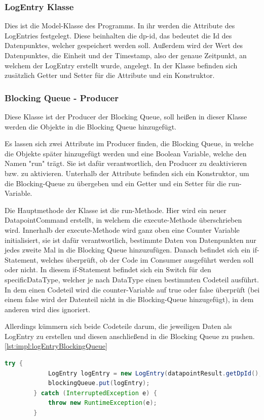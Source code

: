 \subsubsection{LogEntry Klasse}
Dies ist die Model-Klasse des Programms. In ihr werden die Attribute des LogEntries festgelegt. Diese beinhalten die dp-id, das bedeutet die Id des Datenpunktes, welcher gespeichert werden soll. Außerdem wird der Wert des Datenpunktes, die Einheit und der Timestamp, also der genaue Zeitpunkt, an welchem der LogEntry erstellt wurde, angelegt. In der Klasse befinden sich zusätzlich Getter und Setter für die Attribute und ein Konstruktor.
 
\subsubsection{Blocking Queue - Producer }
Diese Klasse ist der Producer der Blocking Queue, soll heißen in dieser Klasse werden die Objekte in die Blocking Queue hinzugefügt.
 
Es lassen sich zwei Attribute im Producer finden, die Blocking Queue, in welche die Objekte später hinzugefügt werden und eine Boolean Variable, welche den Namen "run" trägt. Sie ist dafür verantwortlich, den Producer zu deaktivieren bzw. zu aktivieren. Unterhalb der Attribute befinden sich ein Konstruktor, um die Blocking-Queue zu übergeben und ein Getter und ein Setter für die run-Variable.

Die Hauptmethode der Klasse ist die run-Methode. Hier wird ein neuer DatapointCommand erstellt, in welchem die execute-Methode überschrieben wird. Innerhalb der execute-Methode wird ganz oben eine Counter Variable initialisiert, sie ist dafür verantwortlich, bestimmte Daten von Datenpunkten nur jedes zweite Mal in die Blocking Queue hinzuzufügen. Danach befindet sich ein if-Statement, welches überprüft, ob der Code im Consumer ausgeführt werden soll oder nicht. In diesem if-Statement befindet sich ein Switch für den specificDataType, welcher je nach DataType einen bestimmten Codeteil ausführt. In dem einen Codeteil wird die counter-Variable auf true oder false überprüft (bei einem false wird der Datenteil nicht in die Blocking-Queue hinzugefügt), in dem anderen wird dies ignoriert.
 
Allerdings kümmern sich beide Codeteile darum, die jeweiligen Daten als LogEntry zu erstellen und diesen anschließend in die Blocking Queue zu pushen. \ref{lst:impl:logEntryBlockingQueue}

\begin{lstlisting}[language=java,caption=LogEntry in BlockingQueue hinzufügen,label=lst:impl:logEntryBlockingQueue]
    try {
            LogEntry logEntry = new LogEntry(datapointResult.getDpId(), datapointResult.getValue(), "A", datapointResult.getTimestamp());
            blockingQueue.put(logEntry);
        } catch (InterruptedException e) {
            throw new RuntimeException(e);
        }
\end{lstlisting}

